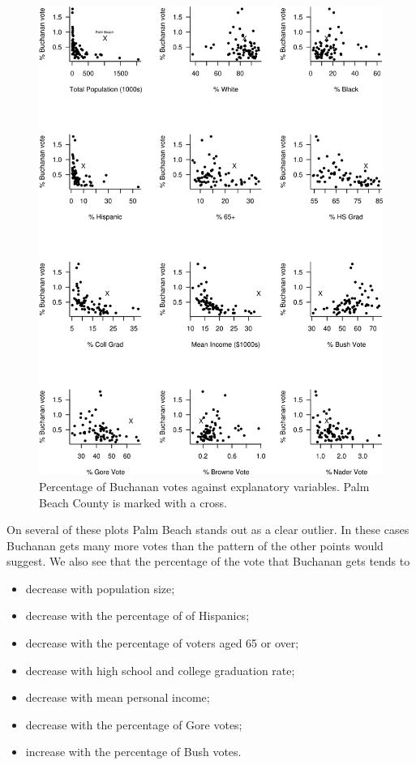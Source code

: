 \documentclass[
  11pt,
  british,
  openany, a4paper]{book}
\providecommand{\tightlist}{%
  \setlength{\itemsep}{0pt}\setlength{\parskip}{0pt}}
\begin{document}
\begin{figure}

{\centering \includegraphics[width=0.75\linewidth]{images/election1} 

}

\caption{ Percentage of Buchanan votes against explanatory variables.  Palm Beach County is marked with a cross.}\label{fig:election1}
\end{figure}

On several of these plots Palm Beach stands out as a clear outlier. In these cases Buchanan gets many more votes than the pattern of the other points would suggest. We also see that the percentage of the vote that Buchanan gets tends to

\begin{itemize}
\tightlist
\item
  decrease with population size;
\item
  decrease with the percentage of of Hispanics;
\item
  decrease with the percentage of voters aged 65 or over;
\item
  decrease with high school and college graduation rate;
\item
  decrease with mean personal income;
\item
  decrease with the percentage of Gore votes;
\item
  increase with the percentage of Bush votes.
\end{itemize}
\end{document}

